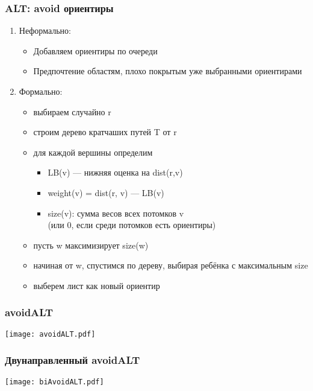 \documentclass{beamer}
\begin{document}
\begin{frame}
\frametitle{ALT: avoid ориентиры}
\begin{enumerate}	
\item Неформально:

	\begin{itemize}
    \item Добавляем ориентиры по очереди
    \item Предпочтение областям, плохо покрытым уже выбранными ориентирами
    \end{itemize}
    
\item Формально:

	\begin{itemize}
    \item выбираем случайно r
    \item строим дерево кратчаших путей T от r
    \item для каждой вершины определим
      \begin{itemize}
      \item LB(v) --- нижняя оценка на dist(r,v)
      \item weight(v) = dist(r, v) --- LB(v)
      \item size(v): сумма весов всех потомков v\\ (или 0, если среди потомков есть ориентиры)
      \end{itemize}
    \item пусть w максимизирует size(w)
    \item начиная от w, спустимся по дереву, выбирая ребёнка с максимальным size
    \item выберем лист как новый ориентир
    \end{itemize}
    
\end{enumerate}

\end{frame}



\begin{frame}
\frametitle{avoidALT}
\texttt{[image: avoidALT.pdf]}
\end{frame}


\begin{frame}
\frametitle{Двунаправленный avoidALT}
\texttt{[image: biAvoidALT.pdf]}
\end{frame}
\end{document}
